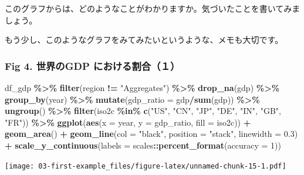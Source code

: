 \documentclass[
  xelatex, ja=standard]{bxjsbook}
\newenvironment{Shaded}{\begin{snugshade}}{\end{snugshade}}
\newcommand{\AttributeTok}[1]{\textcolor[rgb]{0.13,0.29,0.53}{#1}}
\newcommand{\DecValTok}[1]{\textcolor[rgb]{0.00,0.00,0.81}{#1}}
\newcommand{\FloatTok}[1]{\textcolor[rgb]{0.00,0.00,0.81}{#1}}
\newcommand{\FunctionTok}[1]{\textcolor[rgb]{0.13,0.29,0.53}{\textbf{#1}}}
\newcommand{\NormalTok}[1]{#1}
\newcommand{\SpecialCharTok}[1]{\textcolor[rgb]{0.81,0.36,0.00}{\textbf{#1}}}
\newcommand{\StringTok}[1]{\textcolor[rgb]{0.31,0.60,0.02}{#1}}
\theoremstyle{definition}
\theoremstyle{definition}
\theoremstyle{definition}
\theoremstyle{definition}
\theoremstyle{remark}
\begin{document}
このグラフからは、どのようなことがわかりますか。気づいたことを書いてみましょう。

もう少し、このようなグラフをみてみたいというような、メモも大切です。

\hypertarget{fig-4.-ux4e16ux754cux306egdp-ux306bux304aux3051ux308bux5272ux5408uxff11}{%
\subsubsection{Fig 4. 世界のGDP における割合（１）}\label{fig-4.-ux4e16ux754cux306egdp-ux306bux304aux3051ux308bux5272ux5408uxff11}}

\begin{Shaded}
\begin{Highlighting}[]
\NormalTok{df\_gdp }\SpecialCharTok{\%\textgreater{}\%} 
  \FunctionTok{filter}\NormalTok{(region }\SpecialCharTok{!=} \StringTok{"Aggregates"}\NormalTok{) }\SpecialCharTok{\%\textgreater{}\%} \FunctionTok{drop\_na}\NormalTok{(gdp) }\SpecialCharTok{\%\textgreater{}\%} 
  \FunctionTok{group\_by}\NormalTok{(year) }\SpecialCharTok{\%\textgreater{}\%} \FunctionTok{mutate}\NormalTok{(}\AttributeTok{gdp\_ratio =}\NormalTok{ gdp}\SpecialCharTok{/}\FunctionTok{sum}\NormalTok{(gdp)) }\SpecialCharTok{\%\textgreater{}\%} \FunctionTok{ungroup}\NormalTok{() }\SpecialCharTok{\%\textgreater{}\%}
  \FunctionTok{filter}\NormalTok{(iso2c }\SpecialCharTok{\%in\%} \FunctionTok{c}\NormalTok{(}\StringTok{"US"}\NormalTok{, }\StringTok{"CN"}\NormalTok{, }\StringTok{"JP"}\NormalTok{, }\StringTok{"DE"}\NormalTok{, }\StringTok{"IN"}\NormalTok{, }\StringTok{"GB"}\NormalTok{, }\StringTok{"FR"}\NormalTok{))  }\SpecialCharTok{\%\textgreater{}\%}
  \FunctionTok{ggplot}\NormalTok{(}\FunctionTok{aes}\NormalTok{(}\AttributeTok{x =}\NormalTok{ year, }\AttributeTok{y =}\NormalTok{ gdp\_ratio, }\AttributeTok{fill =}\NormalTok{ iso2c)) }\SpecialCharTok{+} \FunctionTok{geom\_area}\NormalTok{() }\SpecialCharTok{+}
  \FunctionTok{geom\_line}\NormalTok{(}\AttributeTok{col =} \StringTok{"black"}\NormalTok{, }\AttributeTok{position =} \StringTok{"stack"}\NormalTok{, }\AttributeTok{linewidth =} \FloatTok{0.3}\NormalTok{) }\SpecialCharTok{+} 
  \FunctionTok{scale\_y\_continuous}\NormalTok{(}\AttributeTok{labels =}\NormalTok{ scales}\SpecialCharTok{::}\FunctionTok{percent\_format}\NormalTok{(}\AttributeTok{accuracy =} \DecValTok{1}\NormalTok{))}
\end{Highlighting}
\end{Shaded}

\texttt{[image: 03-first-example\_files/figure-latex/unnamed-chunk-15-1.pdf]}
\end{document}
